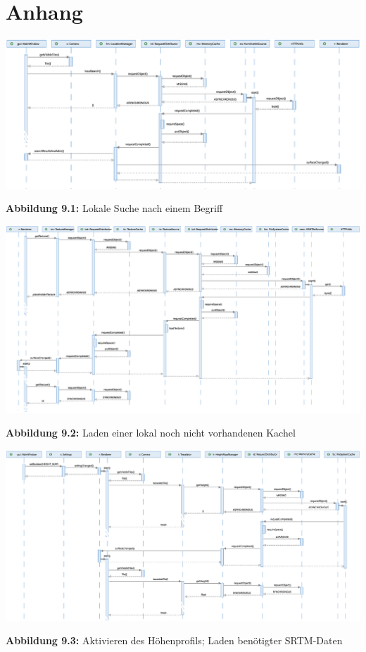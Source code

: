 \documentclass[10pt]{scrreprt}
\begin{document}
\chapter{Anhang}
\centering
\thispagestyle{empty}
\includegraphics[scale=0.45,angle=90,origin=c]{sequenz-search.eps}
\hspace{5mm}
\begin{rotate}{90}
\textbf{Abbildung 9.1:} Lokale Suche nach einem Begriff
\end{rotate}

\thispagestyle{empty}
\includegraphics[scale=0.45,angle=90,origin=c]{sequenz-osmtile.eps}
\hspace{5mm}
\begin{rotate}{90}
\textbf{Abbildung 9.2:} Laden einer lokal noch nicht vorhandenen Kachel
\end{rotate}

\thispagestyle{empty}
\includegraphics[scale=0.45,angle=90,origin=c]{sequenz-height.eps}
\hspace{5mm}
\begin{rotate}{90}
\textbf{Abbildung 9.3:} Aktivieren des Höhenprofils; Laden benötigter SRTM-Daten
\end{rotate}

\restoregeometry
\end{document}
